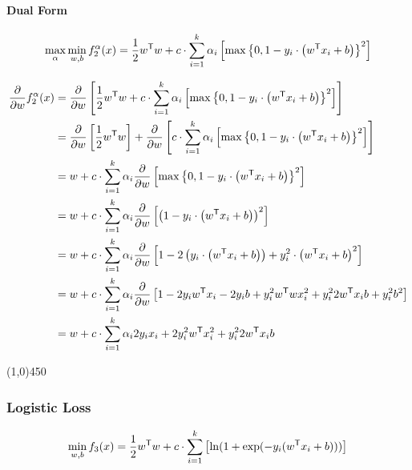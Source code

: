 \documentclass[15pt,landscape]{article}
\newcommand{\hr}{\begin{center} \line(1,0){450} \end{center}}
\newcommand{\tr}{^\mathsf{T}}
\begin{document}
\paragraph{Dual Form}
\begin{align*}
\max\limits_{\alpha} \min\limits_{w,b} f^{\alpha}_2(x) = \frac{1}{2} w\tr w +c \cdot \sum\limits_{i=1}^k \alpha_i \left[ \twoLossReg \right]\\
\end{align*}

\begin{align}
\frac{\partial}{\partial w} f^{\alpha}_2(x) &= \frac{\partial}{\partial w} \left[  \frac{1}{2} w\tr w +c \cdot \sum\limits_{i=1}^k \alpha_i \left[ \twoLossReg \right] \right]\nonumber\\
&= \frac{\partial}{\partial w} \left[  \frac{1}{2} w\tr w \right] + \frac{\partial}{\partial w} \left[  c \cdot \sum\limits_{i=1}^k \alpha_i \left[\twoLossReg \right] \right]\nonumber\\
&= w +   c \cdot \sum\limits_{i=1}^k \alpha_i \frac{\partial}{\partial w} \left[\twoLossReg \right]\nonumber\\
&= w +   c \cdot \sum\limits_{i=1}^k \alpha_i \frac{\partial}{\partial w} \left[  \left(1-y_i \cdot \left( w\tr x_i + b \right) \right)^2 \right]\nonumber\\
&= w +   c \cdot \sum\limits_{i=1}^k \alpha_i \frac{\partial}{\partial w} \left[ 1 - 2 \left(y_i \cdot \left( w\tr x_i + b \right) \right) + y_i^2 \cdot \left( w\tr x_i + b \right)^2 \right]\nonumber\\
&= w +   c \cdot \sum\limits_{i=1}^k \alpha_i \frac{\partial}{\partial w} \left[ 1 - 2 y_i w\tr x_i - 2 y_i b  + y_i^2 w\tr w x_i^2 + y_i^2 2 w\tr x_i  b + y_i^2 b^2 \right]\nonumber\\
&= w +   c \cdot \sum\limits_{i=1}^k \alpha_i 2 y_i x_i   + 2 y_i^2 w\tr x_i^2 + y_i^2 2 w\tr x_i  b \nonumber\\
\end{align}



\hr
\subsubsection*{Logistic Loss}
\newcommand{\zLog}{1+\exp(-y_i (w\tr x_i + b))}

\begin{equation}
\min\limits_{w,b} f_3(x) = \frac{1}{2} w\tr w +c \cdot \sum\limits_{i=1}^k \left[ \ln(\zLog)\right]\\
\end{equation}
\end{document}

